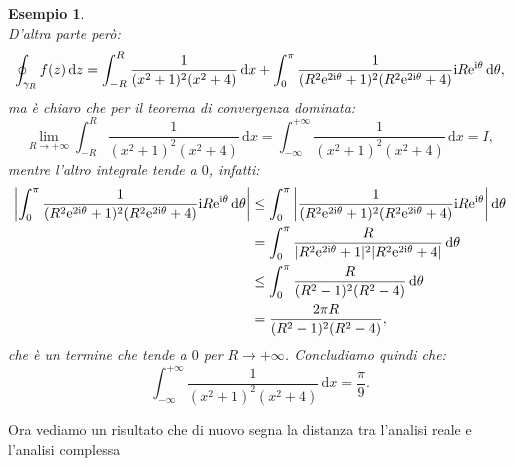 \documentclass[11pt]{book}
\theoremstyle{Definizione}
\theoremstyle{TeoremaProposizioneLemmaCorollarioCongettura}
\theoremstyle{OsservazioneNotaEsempio}
\newtheorem{myes}{Esempio}[section]
\renewcommand{\i}{\textup{i}}
\newcommand{\e}{\textup{e}}
\renewcommand{\d}{\mathrm{d}}
\newcommand{\dz}{\,\d z}
\newcommand{\dx}{\,\d x}
\newcommand{\dtheta}{\, \d \theta}
\begin{document}
\begin{myes}
$$$$
D'altra parte però:
$$
\oint_{\gamma_R} f(z)\dz = \int_{-R}^{R} \frac{1}{(x^2+1)^2(x^2+4)}\dx + \int_{0}^{\pi} \frac{1}{(R^2\e^{2\i\theta}+1)^2(R^2\e^{2\i\theta}+4)}\i R \e^{\i\theta}\, \d\theta,
$$
ma è chiaro che per il teorema di convergenza dominata:
$$
\lim_{R \to +\infty} \int_{-R}^{R} \frac{1}{(x^2+1)^2(x^2+4)}\dx = \int_{-\infty}^{+\infty} \frac{1}{(x^2+1)^2(x^2+4)}\dx = I,
$$
mentre l'altro integrale tende a $0$, infatti:
\begin{align*}
\left|\int_{0}^{\pi} \frac{1}{(R^2\e^{2\i\theta}+1)^2(R^2\e^{2\i\theta}+4)}\i R \e^{\i\theta}\, \d\theta\right| &\leq \int_{0}^{\pi} \left|\frac{1}{(R^2\e^{2\i\theta}+1)^2(R^2\e^{2\i\theta}+4)}\i R \e^{\i\theta}\right| \d\theta \\
&= \int_{0}^{\pi} \frac{R}{|R^2\e^{2\i\theta}+1|^2|R^2\e^{2\i\theta}+4|}\, \d\theta \\
&\leq \int_0^{\pi}\frac{R}{(R^2-1)^2(R^2-4)}\dtheta \\
&= \frac{2\pi R}{(R^2-1)^2(R^2-4)},
\end{align*} 
che è un termine che tende a $0$ per $R \to +\infty$. Concludiamo quindi che:
$$
\int_{-\infty}^{+\infty} \frac{1}{(x^2+1)^2(x^2+4)}\dx = \frac{\pi}{9}.
$$
\end{myes}
Ora vediamo un risultato che di nuovo segna la distanza tra l'analisi reale e l'analisi complessa
\end{document}
